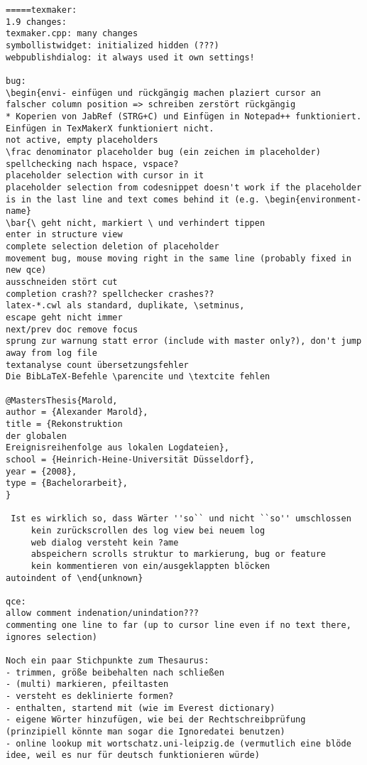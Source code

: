 \documentclass[10pt,a4paper,landscape]{report}
\begin{document}
\begin{verbatim}
=====texmaker: 
1.9 changes:
texmaker.cpp: many changes
symbollistwidget: initialized hidden (???)
webpublishdialog: it always used it own settings!

bug: 
\begin{envi- einfügen und rückgängig machen plaziert cursor an falscher column position => schreiben zerstört rückgängig
* Koperien von JabRef (STRG+C) und Einfügen in Notepad++ funktioniert. Einfügen in TexMakerX funktioniert nicht.
not active, empty placeholders
\frac denominator placeholder bug (ein zeichen im placeholder)
spellchecking nach hspace, vspace?
placeholder selection with cursor in it
placeholder selection from codesnippet doesn't work if the placeholder is in the last line and text comes behind it (e.g. \begin{environment-name}
\bar{\ geht nicht, markiert \ und verhindert tippen
enter in structure view
complete selection deletion of placeholder
movement bug, mouse moving right in the same line (probably fixed in new qce)
ausschneiden stört cut
completion crash?? spellchecker crashes??
latex-*.cwl als standard, duplikate, \setminus, 
escape geht nicht immer
next/prev doc remove focus
sprung zur warnung statt error (include with master only?), don't jump away from log file
textanalyse count übersetzungsfehler
Die BibLaTeX-Befehle \parencite und \textcite fehlen

@MastersThesis{Marold,
author = {Alexander Marold},
title = {Rekonstruktion 
der globalen 
Ereignisreihenfolge aus lokalen Logdateien},
school = {Heinrich-Heine-Universität Düsseldorf},
year = {2008},
type = {Bachelorarbeit},
}

 Ist es wirklich so, dass Wärter ''so`` und nicht ``so'' umschlossen
     kein zurückscrollen des log view bei neuem log
     web dialog versteht kein ?ame
     abspeichern scrolls struktur to markierung, bug or feature
     kein kommentieren von ein/ausgeklappten blöcken
autoindent of \end{unknown}

qce:
allow comment indenation/unindation???
commenting one line to far (up to cursor line even if no text there, ignores selection)

Noch ein paar Stichpunkte zum Thesaurus:
- trimmen, größe beibehalten nach schließen
- (multi) markieren, pfeiltasten
- versteht es deklinierte formen?
- enthalten, startend mit (wie im Everest dictionary)
- eigene Wörter hinzufügen, wie bei der Rechtschreibprüfung (prinzipiell könnte man sogar die Ignoredatei benutzen)
- online lookup mit wortschatz.uni-leipzig.de (vermutlich eine blöde idee, weil es nur für deutsch funktionieren würde)


\end{verbatim}
\end{document}
